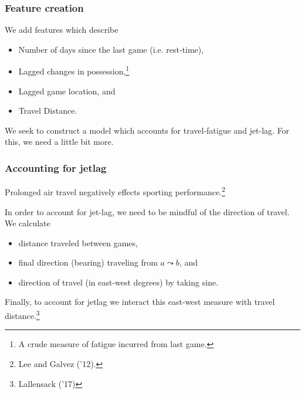 \documentclass{beamer}
\begin{document}
\begin{frame}   \frametitle{Feature creation}
  We add features which describe
  \vspace{12pt}  
  \begin{itemize}     
    \item Number of days since the last game (i.e. rest-time),
    \item Lagged changes in possession,\footnote{A crude measure of fatigue incurred from last game.}
    \item Lagged game location, and
    \item Travel Distance.   
  \end{itemize}
  \vspace{12pt}We seek to construct a model which accounts for travel-fatigue and jet-lag.
  For this, we need a little bit more. \end{frame}

\begin{frame}   \frametitle{Accounting for jetlag}
  Prolonged air travel negatively effects sporting performance.\footnote{Lee and Galvez ('12).}

  \vspace{12pt}In order to account for jet-lag, we need to be mindful of the direction of travel. We calculate
  \vspace{12pt}\begin{itemize}     \item distance traveled between games,
    \item final direction (bearing) traveling from $a \leadsto b$, and
    \item direction of travel (in east-west degrees) by taking sine.
  \end{itemize}
  \vspace{12pt}Finally, to account for jetlag we interact this east-west measure with travel distance.\footnote{Lallensack ('17)} \end{frame}
\end{document}
